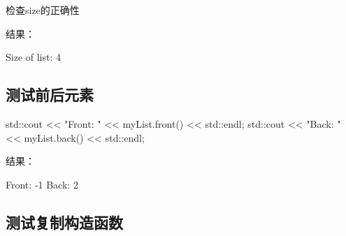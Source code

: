 \documentclass[
]{article}
\newenvironment{Shaded}{}{}
\newcommand{\BuiltInTok}[1]{\textcolor[rgb]{0.00,0.50,0.00}{#1}}
\newcommand{\NormalTok}[1]{#1}
\newcommand{\OperatorTok}[1]{\textcolor[rgb]{0.40,0.40,0.40}{#1}}
\newcommand{\StringTok}[1]{\textcolor[rgb]{0.25,0.44,0.63}{#1}}
\begin{document}
检查size的正确性

结果：

\begin{Shaded}
\begin{Highlighting}[]
\NormalTok{Size of list: 4}
\end{Highlighting}
\end{Shaded}

\hypertarget{ux6d4bux8bd5ux524dux540eux5143ux7d20}{%
\subsection{测试前后元素}\label{ux6d4bux8bd5ux524dux540eux5143ux7d20}}

\begin{Shaded}
\begin{Highlighting}[]
\BuiltInTok{std::}\NormalTok{cout}\OperatorTok{ \textless{}\textless{}} \StringTok{"Front: "} \OperatorTok{\textless{}\textless{}}\NormalTok{ myList}\OperatorTok{.}\NormalTok{front}\OperatorTok{()} \OperatorTok{\textless{}\textless{}} \BuiltInTok{std::}\NormalTok{endl}\OperatorTok{;}
\BuiltInTok{std::}\NormalTok{cout}\OperatorTok{ \textless{}\textless{}} \StringTok{"Back: "} \OperatorTok{\textless{}\textless{}}\NormalTok{ myList}\OperatorTok{.}\NormalTok{back}\OperatorTok{()} \OperatorTok{\textless{}\textless{}} \BuiltInTok{std::}\NormalTok{endl}\OperatorTok{;}
\end{Highlighting}
\end{Shaded}

结果：

\begin{Shaded}
\begin{Highlighting}[]
\NormalTok{Front: {-}1}
\NormalTok{Back: 2}
\end{Highlighting}
\end{Shaded}

\hypertarget{ux6d4bux8bd5ux590dux5236ux6784ux9020ux51fdux6570}{%
\subsection{测试复制构造函数}\label{ux6d4bux8bd5ux590dux5236ux6784ux9020ux51fdux6570}}
\end{document}
